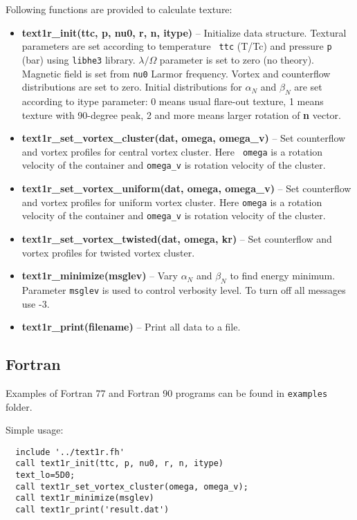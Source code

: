 \documentclass[a4paper]{article}
\begin{document}
Following functions are provided to calculate texture:
\begin{itemize}

\item {\bf text1r\_init(ttc, p, nu0, r, n, itype)} -- Initialize data
structure. Textural parameters are set according to temperature {\tt
ttc} (T/Tc) and pressure {\tt p} (bar) using {\tt libhe3} library.
$\lambda/\Omega$ parameter is set to zero (no theory). Magnetic field is
set from {\tt nu0} Larmor frequency. Vortex and counterflow
distributions are set to zero. Initial distributions for $\alpha_N$ and
$\beta_N$ are set according to itype parameter: 0 means usual flare-out
texture, 1 means texture with 90-degree peak, 2 and more means larger
rotation of {\bf n} vector.

\item {\bf text1r\_set\_vortex\_cluster(dat, omega, omega\_v)} -- Set
counterflow and vortex profiles for central vortex cluster. Here {\tt
omega} is a rotation velocity of the container and {\tt omega\_v} is
rotation velocity of the cluster.

\item {\bf text1r\_set\_vortex\_uniform(dat, omega, omega\_v)} -- Set
counterflow and vortex profiles for uniform vortex cluster. Here
{\tt omega} is a rotation velocity of the container and {\tt omega\_v}
is rotation velocity of the cluster.

\item {\bf text1r\_set\_vortex\_twisted(dat, omega, kr)} -- Set
counterflow and vortex profiles for twisted vortex cluster.

\item {\bf text1r\_minimize(msglev)} -- Vary $\alpha_N$ and $\beta_N$
to find energy minimum. Parameter {\tt msglev} is used to control verbosity
level. To turn off all messages use -3.

\item {\bf text1r\_print(filename)} -- Print all data to a file.

\end{itemize}

\eject
\subsection*{Fortran}

Examples of Fortran 77 and Fortran 90 programs can be found in
{\tt examples} folder.

Simple usage:
\begin{verbatim}
  include '../text1r.fh'
  call text1r_init(ttc, p, nu0, r, n, itype)
  text_lo=5D0;
  call text1r_set_vortex_cluster(omega, omega_v);
  call text1r_minimize(msglev)
  call text1r_print('result.dat')
\end{verbatim}
\end{document}
